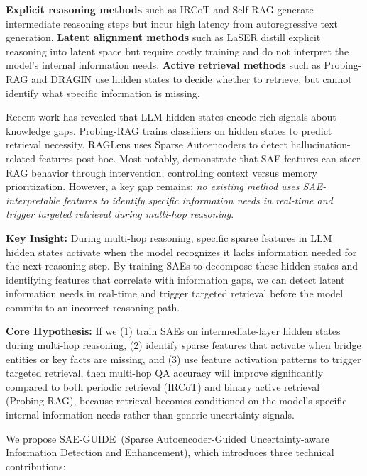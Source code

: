 \documentclass{article}
\newcommand{\ours}{SAE-GUIDE}
\begin{document}
\textbf{Explicit reasoning methods} such as IRCoT \citep{trivedi2023ircot} and Self-RAG \citep{asai2024selfrag} generate intermediate reasoning steps but incur high latency from autoregressive text generation. \textbf{Latent alignment methods} such as LaSER \citep{jin2026laser} distill explicit reasoning into latent space but require costly training and do not interpret the model's internal information needs. \textbf{Active retrieval methods} such as Probing-RAG \citep{probingrag2024} and DRAGIN \citep{su2024dragin} use hidden states to decide whether to retrieve, but cannot identify what specific information is missing.

Recent work has revealed that LLM hidden states encode rich signals about knowledge gaps. Probing-RAG \citep{probingrag2024} trains classifiers on hidden states to predict retrieval necessity. RAGLens \citep{raglens2026} uses Sparse Autoencoders to detect hallucination-related features post-hoc. Most notably, \citet{xin-etal-2025-sparse} demonstrate that SAE features can steer RAG behavior through intervention, controlling context versus memory prioritization. However, a key gap remains: \textit{no existing method uses SAE-interpretable features to identify specific information needs in real-time and trigger targeted retrieval during multi-hop reasoning}.

\textbf{Key Insight:} During multi-hop reasoning, specific sparse features in LLM hidden states activate when the model recognizes it lacks information needed for the next reasoning step. By training SAEs to decompose these hidden states and identifying features that correlate with information gaps, we can detect latent information needs in real-time and trigger targeted retrieval before the model commits to an incorrect reasoning path.

\textbf{Core Hypothesis:} If we (1) train SAEs on intermediate-layer hidden states during multi-hop reasoning, (2) identify sparse features that activate when bridge entities or key facts are missing, and (3) use feature activation patterns to trigger targeted retrieval, then multi-hop QA accuracy will improve significantly compared to both periodic retrieval (IRCoT) and binary active retrieval (Probing-RAG), because retrieval becomes conditioned on the model's specific internal information needs rather than generic uncertainty signals.

We propose \ours\ (Sparse Autoencoder-Guided Uncertainty-aware Information Detection and Enhancement), which introduces three technical contributions:
\end{document}
